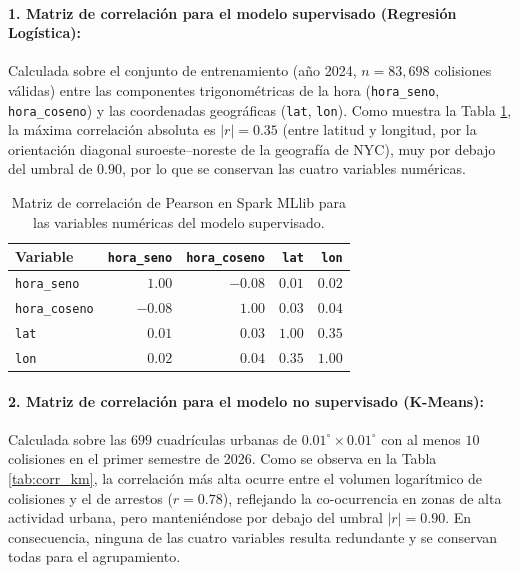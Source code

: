 \documentclass[11pt,a4paper]{article}
\begin{document}
\paragraph{1. Matriz de correlación para el modelo supervisado (Regresión Logística):}
Calculada sobre el conjunto de entrenamiento (año 2024, $n = 83,698$ colisiones válidas) entre las componentes trigonométricas de la hora (\texttt{hora\_seno}, \texttt{hora\_coseno}) y las coordenadas geográficas (\texttt{lat}, \texttt{lon}). Como muestra la Tabla \ref{tab:corr_lr}, la máxima correlación absoluta es $|r| = 0.35$ (entre latitud y longitud, por la orientación diagonal suroeste--noreste de la geografía de NYC), muy por debajo del umbral de $0.90$, por lo que se conservan las cuatro variables numéricas.

\begin{table}[H]
\centering
\small
\renewcommand{\arraystretch}{1.2}
\caption{Matriz de correlación de Pearson en Spark MLlib para las variables numéricas del modelo supervisado.}
\label{tab:corr_lr}
\begin{tabular}{l r r r r}
\toprule
\textbf{Variable} & \textbf{\texttt{hora\_seno}} & \textbf{\texttt{hora\_coseno}} & \textbf{\texttt{lat}} & \textbf{\texttt{lon}} \\
\midrule
\texttt{hora\_seno} & $1.00$ & $-0.08$ & $0.01$ & $0.02$ \\
\texttt{hora\_coseno} & $-0.08$ & $1.00$ & $0.03$ & $0.04$ \\
\texttt{lat} & $0.01$ & $0.03$ & $1.00$ & $\mathbf{0.35}$ \\
\texttt{lon} & $0.02$ & $0.04$ & $\mathbf{0.35}$ & $1.00$ \\
\bottomrule
\end{tabular}
\end{table}

\paragraph{2. Matriz de correlación para el modelo no supervisado (K-Means):}
Calculada sobre las $699$ cuadrículas urbanas de $0.01^\circ \times 0.01^\circ$ con al menos $10$ colisiones en el primer semestre de 2026. Como se observa en la Tabla \ref{tab:corr_km}, la correlación más alta ocurre entre el volumen logarítmico de colisiones y el de arrestos ($r = 0.78$), reflejando la co-ocurrencia en zonas de alta actividad urbana, pero manteniéndose por debajo del umbral $|r| = 0.90$. En consecuencia, ninguna de las cuatro variables resulta redundante y se conservan todas para el agrupamiento.
\end{document}
